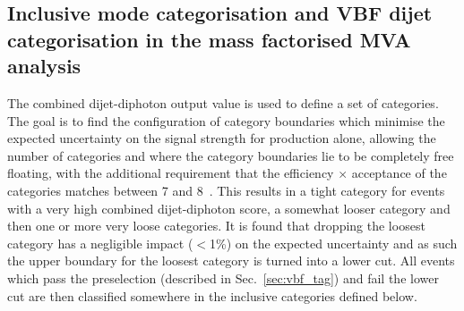 
\subsection{Inclusive mode categorisation and VBF dijet categorisation in the mass factorised \acs{MVA} analysis}
\label{sec:inclusive_cats_massfac}

The combined dijet-diphoton \BDT output value is used to define a set of \VBF categories. The goal is to find the configuration of category boundaries which minimise the expected uncertainty on the signal strength for \VBF production alone, allowing the number of categories and where the category boundaries lie to be completely free floating, with the additional requirement that the efficiency $\times$ acceptance of the categories matches between 7 and 8~\TeV. This results in a tight \VBF category for events with a very high combined dijet-diphoton \BDT score, a somewhat looser category and then one or more very loose categories. It is found that dropping the loosest category has a negligible impact ($<$1\%) on the expected uncertainty and as such the upper boundary for the loosest category is turned into a lower cut. All events which pass the \VBF preselection (described in Sec.~\ref{sec:vbf_tag}) and fail the lower cut are then classified somewhere in the inclusive categories defined below. 

